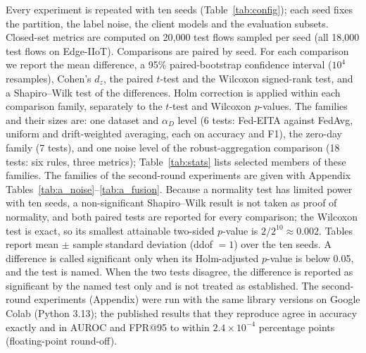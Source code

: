 \documentclass[pdflatex,sn-mathphys-num]{sn-jnl}
\newcommand{\Rtwo}{\color{blue}}
\begin{document}
{{Every experiment is repeated with ten seeds (Table~\ref{tab:config}); each seed fixes the partition, the label noise, the client models and the evaluation subsets. Closed-set metrics are computed on 20{,}000 test flows sampled per seed (all 18{,}000 test flows on Edge-IIoT). Comparisons are paired by seed. For each comparison we report the mean difference, a 95\% paired-bootstrap confidence interval ($10^4$ resamples), Cohen's $d_z$, the paired $t$-test and the Wilcoxon signed-rank test, and a Shapiro--Wilk test of the differences. Holm correction is applied within each comparison family, separately to the $t$-test and Wilcoxon $p$-values. {\Rtwo The families and their sizes are: one dataset and $\alpha_D$ level (6 tests: Fed-EITA against FedAvg, uniform and drift-weighted averaging, each on accuracy and F1), the zero-day family (7 tests), and one noise level of the robust-aggregation comparison (18 tests: six rules, three metrics); Table~\ref{tab:stats} lists selected members of these families. The families of the second-round experiments are given with Appendix Tables~\ref{tab:a_noise}--\ref{tab:a_fusion}.} Because a normality test has limited power with ten seeds, a non-significant Shapiro--Wilk result is not taken as proof of normality, and both paired tests are reported for every comparison; the Wilcoxon test is exact, so its smallest attainable two-sided $p$-value is $2/2^{10}\approx0.002$. {\Rtwo Tables report mean $\pm$ sample standard deviation (ddof $=1$) over the ten seeds.} A difference is called significant only when its Holm-adjusted $p$-value is below 0.05, and the test is named. {\Rtwo When the two tests disagree, the difference is reported as significant by the named test only and is not treated as established. The second-round experiments (Appendix) were run with the same library versions on Google Colab (Python 3.13); the published results that they reproduce agree in accuracy exactly and in AUROC and FPR@95 to within $2.4\times10^{-4}$ percentage points (floating-point round-off).}}





}
\end{document}
